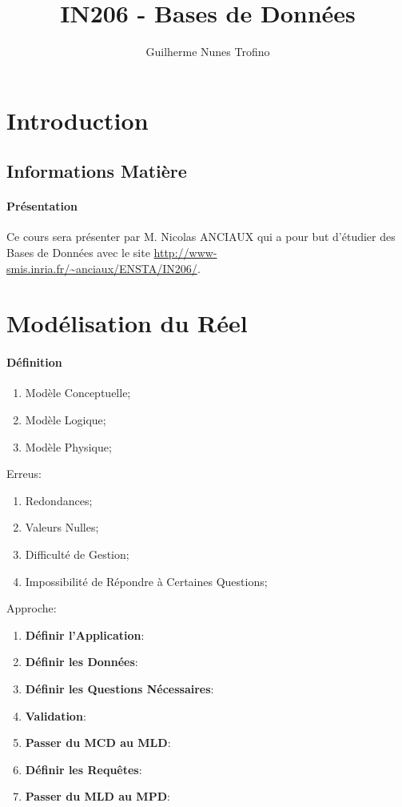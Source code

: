 \documentclass{article}
\title{IN206 - Bases de Données}
\author{Guilherme Nunes Trofino}
\begin{document}
\maketitle

\newpage\tableofcontents

\section{Introduction}



\subsection{Informations Matière}
\paragraph{Présentation}Ce cours sera présenter par M. Nicolas ANCIAUX qui a pour but d'étudier des Bases de Données avec le site \url{http://www-smis.inria.fr/~anciaux/ENSTA/IN206/}.

\section{Modélisation du Réel}
\paragraph{Définition}
\begin{enumerate}[noitemsep]
    \item Modèle Conceptuelle;
    \item Modèle Logique;
    \item Modèle Physique;
\end{enumerate}
Erreus:
\begin{enumerate}[noitemsep]
    \item Redondances;
    \item Valeurs Nulles;
    \item Difficulté de Gestion;
    \item Impossibilité de Répondre à Certaines Questions;
\end{enumerate}
Approche:
\begin{enumerate}
    \item \textbf{Définir l'Application}:
    \item \textbf{Définir les Données}:
    \item \textbf{Définir les Questions Nécessaires}:
    \item \textbf{Validation}:
    \item \textbf{Passer du MCD au MLD}:
    \item \textbf{Définir les Requêtes}:
    \item \textbf{Passer du MLD au MPD}:
\end{enumerate}
\end{document}
